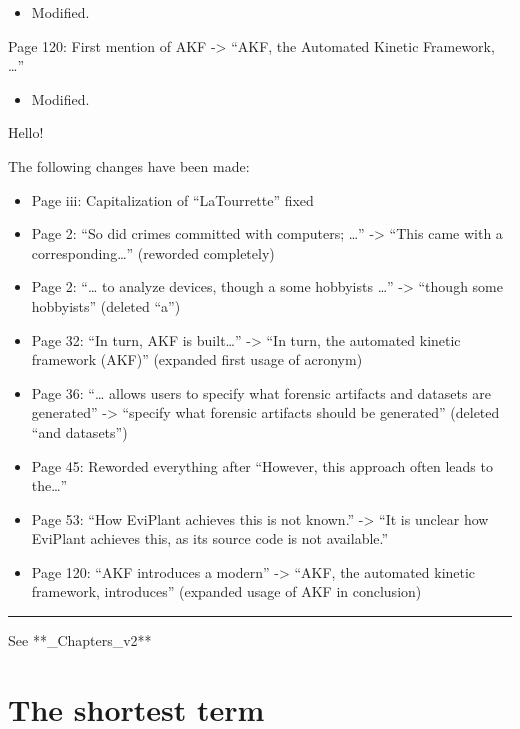 \begin{itemize}
\tightlist
\item
  Modified.
\end{itemize}

Page 120: First mention of AKF -\textgreater{} ``AKF, the Automated
Kinetic Framework, \ldots{}''

\begin{itemize}
\tightlist
\item
  Modified.
\end{itemize}

Hello!

The following changes have been made:

\begin{itemize}
\tightlist
\item
  Page iii: Capitalization of ``LaTourrette'' fixed
\item
  Page 2: ``So did crimes committed with computers; \ldots{}''
  -\textgreater{} ``This came with a corresponding\ldots{}'' (reworded
  completely)
\item
  Page 2: ``\ldots{} to analyze devices, though a some hobbyists
  \ldots{}'' -\textgreater{} ``though some hobbyists'' (deleted ``a'')
\item
  Page 32: ``In turn, AKF is built\ldots{}'' -\textgreater{} ``In turn,
  the automated kinetic framework (AKF)'' (expanded first usage of
  acronym)
\item
  Page 36: ``\ldots{} allows users to specify what forensic artifacts
  and datasets are generated'' -\textgreater{} ``specify what forensic
  artifacts should be generated'' (deleted ``and datasets'')
\item
  Page 45: Reworded everything after ``However, this approach often
  leads to the\ldots{}''
\item
  Page 53: ``How EviPlant achieves this is not known.'' -\textgreater{}
  ``It is unclear how EviPlant achieves this, as its source code is not
  available.''
\item
  Page 120: ``AKF introduces a modern'' -\textgreater{} ``AKF, the
  automated kinetic framework, introduces'' (expanded usage of AKF in
  conclusion)
\end{itemize}

\begin{center}\rule{0.5\linewidth}{0.5pt}\end{center}

See **\_Chapters\_v2**

\section{The shortest term}\label{the-shortest-term}

